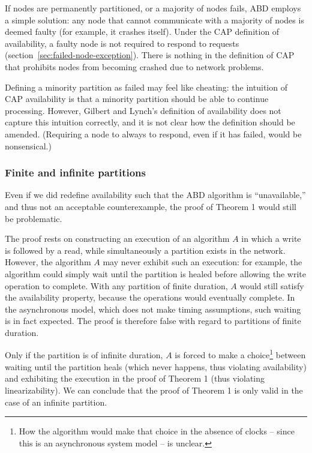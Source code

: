 \documentclass[a4paper,twocolumn,10pt]{article}
\begin{document}
If nodes are permanently partitioned, or a majority of nodes fails, ABD employs a simple solution:
any node that cannot communicate with a majority of nodes is deemed faulty (for example, it crashes
itself). Under the CAP definition of availability, a faulty node is not required to respond to
requests (section~\ref{sec:failed-node-exception}). There is nothing in the definition of CAP that
prohibits nodes from becoming crashed due to network problems.

Defining a minority partition as failed may feel like cheating: the intuition of CAP availability is
that a minority partition should be able to continue processing. However, Gilbert and Lynch's
definition of availability does not capture this intuition correctly, and it is not clear how the
definition should be amended. (Requiring a node to always to respond, even if it has failed, would
be nonsensical.)

\subsubsection{Finite and infinite partitions}

Even if we did redefine availability such that the ABD algorithm is ``unavailable,'' and thus not an
acceptable counterexample, the proof of Theorem 1 would still be problematic.

The proof rests on constructing an execution of an algorithm $A$ in which a write is followed by a
read, while simultaneously a partition exists in the network. However, the algorithm $A$ may never
exhibit such an execution: for example, the algorithm could simply wait until the partition is
healed before allowing the write operation to complete. With any partition of finite duration, $A$
would still satisfy the availability property, because the operations would eventually complete. In
the asynchronous model, which does not make timing assumptions, such waiting is in fact expected.
The proof is therefore false with regard to partitions of finite duration.

Only if the partition is of infinite duration, $A$ is forced to make a choice\footnote{How the
algorithm would make that choice in the absence of clocks -- since this is an asynchronous system
model -- is unclear.} between waiting until the partition heals (which never happens, thus violating
availability) and exhibiting the execution in the proof of Theorem 1 (thus violating
linearizability). We can conclude that the proof of Theorem 1 is only valid in the case of an
infinite partition.
\end{document}
